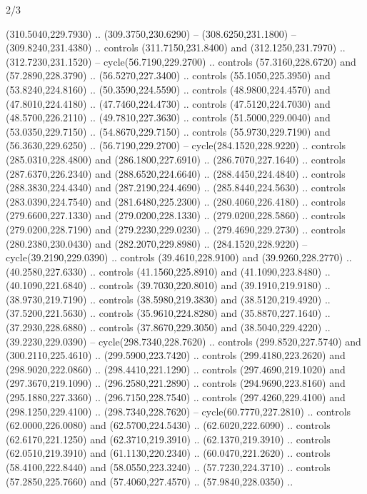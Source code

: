\begin{flagdescription}{2/3}
\begin{scope}[xshift=0.5\flaglength,yshift=0.5\flagwidth,scale=\stretchfactor]
\begin{scope}[scale=0.001645\flagwidth,yshift=65mm,xshift=-63mm]
\begin{scope}[y=0.80pt, x=0.80pt, yscale=-1,]
\begin{scope}[cm={{1.33333,0.0,0.0,1.33333,(0.0,1e-05)}}]
  (310.5040,229.7930) .. (309.3750,230.6290) -- (308.6250,231.1800) --
  (309.8240,231.4380) .. controls (311.7150,231.8400) and (312.1250,231.7970) ..
  (312.7230,231.1520) -- cycle(56.7190,229.2700) .. controls (57.3160,228.6720)
  and (57.2890,228.3790) .. (56.5270,227.3400) .. controls (55.1050,225.3950)
  and (53.8240,224.8160) .. (50.3590,224.5590) .. controls (48.9800,224.4570)
  and (47.8010,224.4180) .. (47.7460,224.4730) .. controls (47.5120,224.7030)
  and (48.5700,226.2110) .. (49.7810,227.3630) .. controls (51.5000,229.0040)
  and (53.0350,229.7150) .. (54.8670,229.7150) .. controls (55.9730,229.7190)
  and (56.3630,229.6250) .. (56.7190,229.2700) -- cycle(284.1520,228.9220) ..
  controls (285.0310,228.4800) and (286.1800,227.6910) .. (286.7070,227.1640) ..
  controls (287.6370,226.2340) and (288.6520,224.6640) .. (288.4450,224.4840) ..
  controls (288.3830,224.4340) and (287.2190,224.4690) .. (285.8440,224.5630) ..
  controls (283.0390,224.7540) and (281.6480,225.2300) .. (280.4060,226.4180) ..
  controls (279.6600,227.1330) and (279.0200,228.1330) .. (279.0200,228.5860) ..
  controls (279.0200,228.7190) and (279.2230,229.0230) .. (279.4690,229.2730) ..
  controls (280.2380,230.0430) and (282.2070,229.8980) .. (284.1520,228.9220) --
  cycle(39.2190,229.0390) .. controls (39.4610,228.9100) and (39.9260,228.2770)
  .. (40.2580,227.6330) .. controls (41.1560,225.8910) and (41.1090,223.8480) ..
  (40.1090,221.6840) .. controls (39.7030,220.8010) and (39.1910,219.9180) ..
  (38.9730,219.7190) .. controls (38.5980,219.3830) and (38.5120,219.4920) ..
  (37.5200,221.5630) .. controls (35.9610,224.8280) and (35.8870,227.1640) ..
  (37.2930,228.6880) .. controls (37.8670,229.3050) and (38.5040,229.4220) ..
  (39.2230,229.0390) -- cycle(298.7340,228.7620) .. controls (299.8520,227.5740)
  and (300.2110,225.4610) .. (299.5900,223.7420) .. controls (299.4180,223.2620)
  and (298.9020,222.0860) .. (298.4410,221.1290) .. controls (297.4690,219.1020)
  and (297.3670,219.1090) .. (296.2580,221.2890) .. controls (294.9690,223.8160)
  and (295.1880,227.3360) .. (296.7150,228.7540) .. controls (297.4260,229.4100)
  and (298.1250,229.4100) .. (298.7340,228.7620) -- cycle(60.7770,227.2810) ..
  controls (62.0000,226.0080) and (62.5700,224.5430) .. (62.6020,222.6090) ..
  controls (62.6170,221.1250) and (62.3710,219.3910) .. (62.1370,219.3910) ..
  controls (62.0510,219.3910) and (61.1130,220.2340) .. (60.0470,221.2620) ..
  controls (58.4100,222.8440) and (58.0550,223.3240) .. (57.7230,224.3710) ..
  controls (57.2850,225.7660) and (57.4060,227.4570) .. (57.9840,228.0350) ..

\end{scope}
\end{scope}
\end{scope}
\end{scope}
\end{flagdescription}
